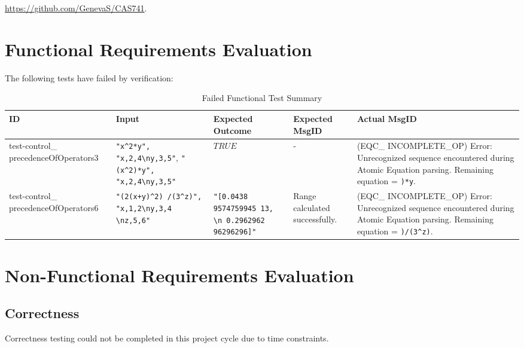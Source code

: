 \documentclass[12pt, titlepage]{article}
\begin{document}
\begin{center}
	\href{https://github.com/GenevaS/CAS741}{https://github.com/GenevaS/CAS741}.
\end{center} 

\section{Functional Requirements Evaluation}

The following tests have failed by verification:

	\begin{center}
		\begin{longtable}{ | p{3cm} | p{3cm} | p{2cm} | p{2cm} | p{3cm} |}
			\caption{Failed Functional Test Summary} \\ \hline 
			\label{TblInputVar} 
			ID & Input & Expected Outcome & Expected MsgID & Actual MsgID \\ 
			\hline
			test-control\_ precedenceOfOperators3 & 
			\texttt{"x\textasciicircum2*y", 
				"x,2,4\textbackslash ny,3,5"}, 
				\texttt{"(x\textasciicircum2)*y", 
				"x,2,4\textbackslash ny,3,5"} & $TRUE$ & - & (EQC\_ 
				INCOMPLETE\_OP) 
			Error: Unrecognized sequence encountered during Atomic Equation 
			parsing. Remaining equation = \texttt{)*y}. \\ \hline
			
			test-control\_ precedenceOfOperators6 & 
			\texttt{"(2(x+y)\textasciicircum2) /(3\textasciicircum z)", 
				"x,1,2\textbackslash ny,3,4 \textbackslash nz,5,6"} & 
			\texttt{"[0.0438 9574759945 13, \textbackslash n 0.2962962 
			96296296]"} 
			& 
			Range calculated successfully. & (EQC\_ INCOMPLETE\_OP) Error: 
			Unrecognized sequence 
			encountered during Atomic Equation parsing. Remaining equation = 
			\texttt{)/(3\textasciicircum z)}. \\ \hline
		\end{longtable}
	\end{center}


\section{Non-Functional Requirements Evaluation}


\subsection{Correctness}
Correctness testing could not be completed in this project cycle due to time 
constraints.
\end{document}
